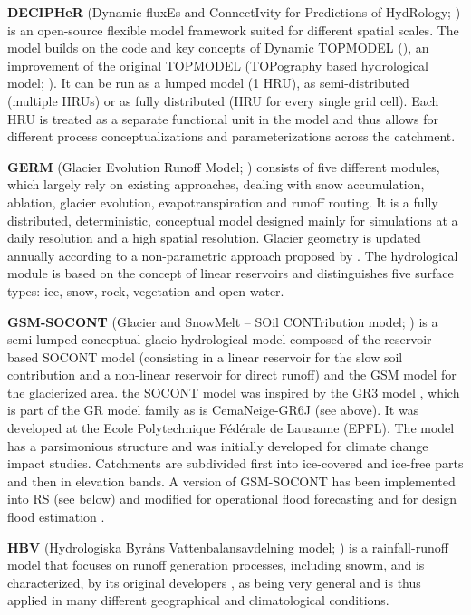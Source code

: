 \documentclass[10pt,a4paper]{article}
\begin{document}
\textbf{DECIPHeR} (Dynamic fluxEs and ConnectIvity for Predictions of HydRology; \citealp{Coxon_2019}) is an open-source flexible model framework suited for different spatial scales. The model builds on the code and key concepts of Dynamic TOPMODEL (\citealp{Beven_2001}), an improvement of the original TOPMODEL (TOPography based hydrological model; \citealp{BEVEN_1979}). It can be run as a lumped model (1 HRU), as semi-distributed (multiple HRUs) or as fully distributed (HRU for every single grid cell). Each HRU is treated as a separate functional unit in the model and thus allows for different process conceptualizations and parameterizations across the catchment.

\textbf{GERM} (Glacier Evolution Runoff Model; \citealt{Huss2016,Farinotti2012}) consists of five different modules, which largely rely on existing approaches, dealing with snow accumulation, ablation, glacier evolution, evapotranspiration and runoff routing. It is a fully distributed, deterministic, conceptual model designed mainly for simulations at a daily resolution and a high spatial resolution. Glacier geometry is updated annually according to a non-parametric approach proposed by \citet{Huss2010}. The hydrological module is based on the concept of linear reservoirs and distinguishes five surface types: ice, snow, rock, vegetation and open water. 

\textbf{GSM-SOCONT} (Glacier and SnowMelt -- SOil CONTribution model; \citealp{Schaefli2005c}) is a semi-lumped conceptual glacio-hydrological model composed of the reservoir-based SOCONT model (consisting in a linear reservoir for the slow soil contribution and a non-linear reservoir for direct runoff) and the GSM model for the glacierized area. the SOCONT model was inspired by the GR3 model \citep{Edijatno_1989}, which is part of the GR model family as is CemaNeige-GR6J (see above). It was developed at the Ecole Polytechnique Fédérale de Lausanne (EPFL). The model has a parsimonious structure and was initially developed for climate change impact studies. Catchments are subdivided first into ice-covered and ice-free parts and then in elevation bands. A version of GSM-SOCONT has been implemented into RS (see below) and modified for operational flood forecasting \citep{Hamdi2005} and for design flood estimation \citep{Zeimetz_2018}.

 \textbf{HBV} (Hydrologiska Byråns Vattenbalansavdelning model; \citealp{Bergstrom1976a,Bergstrom1992,Bergstrom1995,Lindstr_m_1997})  is a rainfall-runoff model that focuses on runoff generation processes, including snowm, and is characterized, by its original developers \citep{Bergstrom1992}, as being very general and is thus applied in many different geographical and climatological conditions. 
\end{document}
